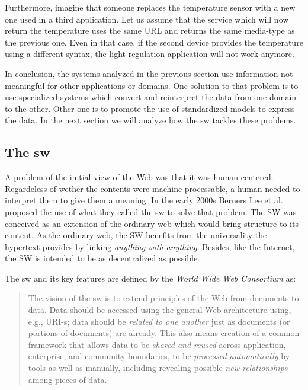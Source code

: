Furthermore, imagine that someone replaces the temperature sensor with a new one used in a third application.
Let us assume that the service which will now return the temperature uses the same URL and returns the same media-type as the previous one.
Even in that case, if the second device provides the temperature using a different syntax, the light regulation application will not work anymore.

\medskip


In conclusion, the systems analyzed in the previous section use information not meaningful for other applications or domains.
One solution to that problem is to use specialized systems which convert and reinterpret the data from one domain to the other.
Other one is to promote the use of standardized models to express the data.
In the next section we will analyze how the \acl{sw} tackles these problems.


\subsection{The \acl{sw}}

A problem of the initial view of the Web was that it was human-centered.
Regardeless of wether the contents were machine processable, a human needed to interpret them to give them a meaning.
In the early 2000s Berners Lee et al. \citep{berners-lee_semantic_2001} proposed the use of what they called the \acf{sw} to solve that problem.
The SW was conceived as an extension of the ordinary web which would bring structure to its content.
As the ordinary web, the SW benefits from the universality the hypertext provides by linking \emph{anything with anything}.
Besides, like the Internet, the SW is intended to be as decentralized as possible.

The \acl{sw} and its key features are defined by the \emph{World Wide Web Consortium} \citep{semanticWeb-FAQ} as:
\begin{quote}
The vision of the \acl{sw} is to extend principles of the Web from documents to data.
Data should be accessed using the general Web architecture using, e.g., URI-s;
data should be \emph{related to one another} just as documents (or portions of documents) are already.
This also means creation of a common framework that allows data to be \emph{shared and reused} across application, enterprise, and community boundaries,
to be \emph{processed automatically} by tools as well as manually, including revealing possible \emph{new relationships} among pieces of data.
\end{quote}

